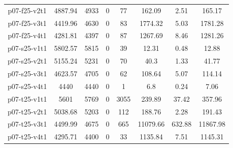 \begin{table}[h!tbp]
\begin {tabular}[t]{|c|c|c|c|c|c|c|c|}
p07-f25-v2t1	&	4887.94	&	4933	&	0	&	77	&	162.09	&	2.51	&	165.17	\\
p07-f25-v3t1	&	4419.96	&	4630	&	0	&	83	&	1774.32	&	5.03	&	1781.28	\\
p07-f25-v4t1	&	4281.81	&	4397	&	0	&	87	&	1267.69	&	8.46	&	1281.26	\\
p07-s25-v1t1	&	5802.57	&	5815	&	0	&	39	&	12.31	&	0.48	&	12.88	\\
p07-s25-v2t1	&	5155.24	&	5231	&	0	&	70	&	40.3	&	1.33	&	41.77	\\
p07-s25-v3t1	&	4623.57	&	4705	&	0	&	62	&	108.64	&	5.07	&	114.14	\\
p07-s25-v4t1	&	4440	&	4440	&	0	&	1	&	6.8	&	0.24	&	7.06	\\
p07-t25-v1t1	&	5601	&	5769	&	0	&	3055	&	239.89	&	37.42	&	357.96	\\
p07-t25-v2t1	&	5038.68	&	5203	&	0	&	112	&	188.76	&	2.28	&	191.43	\\
p07-t25-v3t1	&	4499.99	&	4675	&	0	&	665	&	11079.66	&	632.88	&	11867.98	\\
p07-t25-v4t1	&	4295.71	&	4400	&	0	&	33	&	1135.84	&	7.51	&	1145.31	\\
\hline
\end{tabular}
\end{table} 


